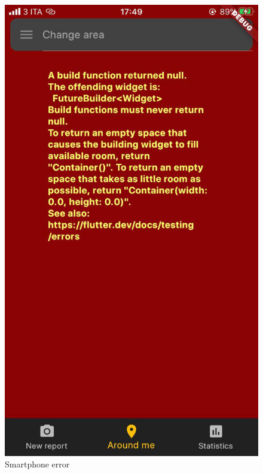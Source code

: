 \documentclass[../ATD.tex]{subfiles}
\begin{document}
    \begin{figure}[H]
        \centering
        \includegraphics{../assets/smartphone_error.png}
        \caption{Smartphone error}
    \end{figure}
\end{document}
